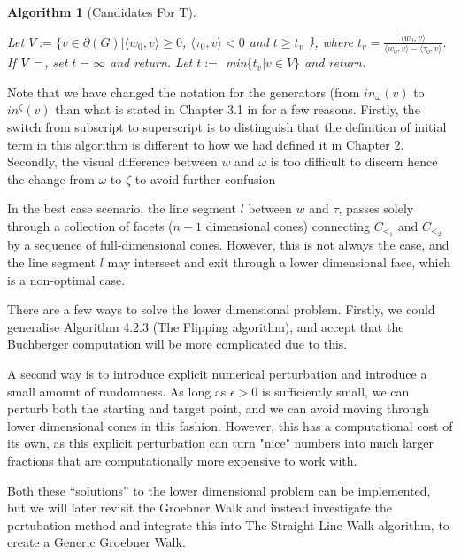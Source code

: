 \documentclass[12pt,a4paper]{report}
\newtheorem{algorithm}{Algorithm}
\begin{document}
\begin{algorithm}[Candidates For T]\
 \begin{algorithmic}[1]
    \STATE Let $V := \{v \in \partial (G) | \langle w_{0}, v \rangle \geq 0$, $\langle \tau_{0}, v \rangle < 0$ and $t \geq t_{v}$ \}, where $t_{v} = \frac{\langle w_{0}, v \rangle}{\langle w_{0}, v \rangle - \langle \tau_{0}, v \rangle}$.
    \STATE If $V = \empty$, set $t = \infty$ and return.
    \STATE Let $t :=$ min$\{ t_{v} | v \in V\}$ and return.
\end{algorithmic}
\end{algorithm}


Note that we have changed the notation for the generators (from $in_{\omega} (v)$ to $in^{\zeta} (v)$ than what is stated in Chapter 3.1 in \cite{GenericGroebner} for a few reasons. Firstly, the switch from subscript to superscript is to distinguish that the definition of initial term in this algorithm is different to how we had defined it in Chapter 2. Secondly, the visual difference between $w$ and $\omega$ is too difficult to discern hence the change from $\omega$ to $\zeta$ to avoid further confusion

In the best case scenario, the line segment $l$ between $w$ and $\tau$, passes solely through a collection of facets ($n-1$ dimensional cones) connecting $C_{<_{1}}$ and $C_{<_{2}}$ by a sequence of full-dimensional cones. However, this is not always the case, and the line segment $l$ may intersect and exit through a lower dimensional face, which is a non-optimal case.

There are a few ways to solve the lower dimensional problem. Firstly, we could generalise Algorithm 4.2.3 (The Flipping algorithm), and accept that the Buchberger computation will be more complicated due to this.

A second way is to introduce explicit numerical perturbation and introduce a small amount of randomness. As long as $\epsilon > 0$ is sufficiently small, we can perturb both the starting and target point, and we can avoid moving through lower dimensional cones in this fashion. However, this has a computational cost of its own, as this explicit perturbation can turn "nice" numbers into much larger fractions that are computationally more expensive to work with.

Both these ``solutions'' to the lower dimensional problem can be implemented, but we will later revisit the Groebner Walk and instead investigate the pertubation method and integrate this into The Straight Line Walk algorithm, to create a Generic Groebner Walk.
\end{document}
